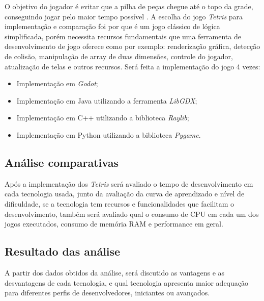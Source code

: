      O objetivo do jogador é evitar que a pilha de peças chegue até o topo da grade, conseguindo jogar pelo maior tempo possível \cite{TetrisWin}.
    A escolha do jogo \textit{Tetris} para implementação e comparação foi por que é um jogo clássico 
    de lógica simplificada, porém necessita recursos fundamentais que uma ferramenta de desenvolvimento 
    de jogo oferece como por exemplo: renderização gráfica, detecção de colisão, manipulação de array de duas
    dimensões, controle do jogador, atualização de telas e outros recursos.
    Será feita a implementação do jogo 4 vezes:
    \begin{itemize}
        \item Implementação em \textit{Godot};
        \item Implementação em Java utilizando a ferramenta \textit{LibGDX};
        \item Implementação em C++ utilizando a biblioteca \textit{Raylib};
        \item Implementação em Python utilizando a biblioteca \textit{Pygame}.
    \end{itemize}

\subsection{Análise comparativas}

Após a implementação dos \textit{Tetris} será avaliado o tempo de desenvolvimento em cada tecnologia usada,
junto da avaliação da curva de aprendizado e nível de dificuldade, se a tecnologia tem recursos e funcionalidades que facilitam o desenvolvimento,
também será avaliado qual o consumo de CPU em cada um dos jogos executados, consumo de memória RAM e performance em geral.

\subsection{Resultado das análise}

A partir dos dados obtidos da análise, será discutido as vantagens e as desvantagens de cada tecnologia, 
e qual tecnologia apresenta maior adequação para diferentes perfis de desenvolvedores, iniciantes ou avançados.

